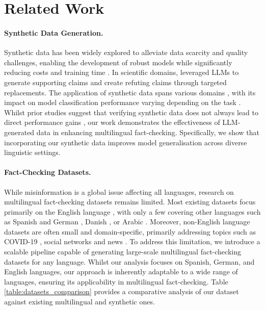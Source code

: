 \section{Related Work}
\label{sec:related_work}
\paragraph{Synthetic Data Generation.}
Synthetic data has been widely explored to alleviate data scarcity and quality challenges, enabling the development of robust models while significantly reducing costs and training time \cite{long-etal-2024-llms, goyal2024systematic, patel2024datadreamer}. In scientific domains, \citet{wright-etal-2022-generating} leveraged LLMs to generate supporting claims and create refuting claims through targeted replacements.  
The application of synthetic data spans various domains \cite{li2023synthetic, xu2024wizardlm, xu2024magpie}, with its impact on model classification performance varying depending on the task \cite{chan2024balancing}. Whilst prior studies suggest that verifying synthetic data does not always lead to direct performance gains \cite{li2023synthetic, yu2024metamath, chan2024balancing}, our work demonstrates the effectiveness of LLM-generated data in enhancing multilingual fact-checking. Specifically, we show that incorporating our synthetic data improves model generalisation across diverse linguistic settings.

 
\paragraph{Fact-Checking Datasets.}
While misinformation is a global issue affecting all languages, research on multilingual fact-checking datasets remains limited. Most existing datasets focus primarily on the English language \cite{thorne-etal-2018-fever, schuster-etal-2021-get}, with only a few covering other languages such as Spanish and German \cite{gupta2021x}, Danish \cite{norregaard-derczynski-2021-danfever}, or Arabic \cite{khouja-2020-stance}. 
Moreover, non-English language datasets are often small and domain-specific, primarily addressing topics such as COVID-19 \cite{li2020mmcovid, shahifakecovid}, social networks \cite{NielsenMcConville2022} and news \cite{gupta2021x}. 
To address this limitation, we introduce a scalable pipeline capable of generating large-scale multilingual fact-checking datasets for any language. Whilst our analysis focuses on Spanish, German, and English languages, our approach is inherently adaptable to a wide range of languages, ensuring its applicability in multilingual fact-checking. Table \ref{table:datasets_comparison} provides a comparative analysis of our dataset against existing multilingual and synthetic ones.


